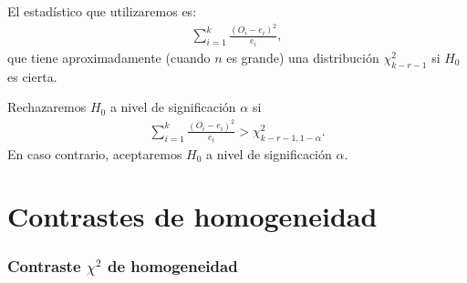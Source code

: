 El estadístico que utilizaremos es:
\begin{align*}
    \sum_{i=1}^{k} \frac{(O_i - e_i)^2}{e_i},
\end{align*}
que tiene aproximadamente (cuando $n$ es grande) una distribución $\chi^2_{k-r-1}$ si $H_0$ es cierta.

Rechazaremos $H_0$ a nivel de significación $\alpha$ si
\begin{align*}
    \sum_{i=1}^{k} \frac{(O_i - e_i)^2}{e_i} > \chi^2_{k-r-1, 1 - \alpha}.
\end{align*}
En caso contrario, aceptaremos $H_0$ a nivel de significación $\alpha$.

\section{Contrastes de homogeneidad}

\subsubsection{Contraste $\chi^2$ de homogeneidad}

